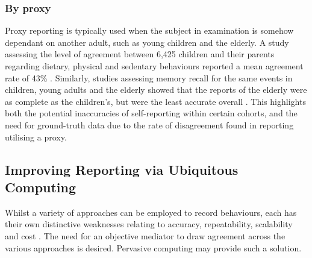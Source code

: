 \subsubsection{By proxy}
Proxy reporting is typically used when the subject in examination is somehow dependant on another adult, such as young children and the elderly. A study assessing the level of agreement between 6,425 children and their parents regarding dietary, physical and sedentary behaviours reported a mean agreement rate of 43\% \cite{Rebholz2014}. Similarly, studies assessing memory recall for the same events in children, young adults and the elderly showed that the reports of the elderly were as complete as the children’s, but were the least accurate overall \cite{Gawrylowicz2014}. This highlights both the potential inaccuracies of self-reporting within certain cohorts, and the need for ground-truth data due to the rate of disagreement found in reporting utilising a proxy.

\subsection{Improving Reporting via Ubiquitous Computing}
Whilst a variety of approaches can be employed to record behaviours, each has their own distinctive weaknesses relating to accuracy, repeatability, scalability and cost \cite{Prince2008}. The need for an objective mediator to draw agreement across the various approaches is desired. Pervasive computing may provide such a solution.

